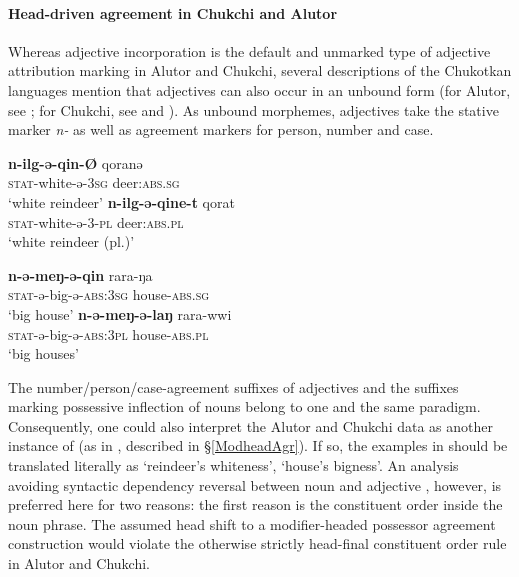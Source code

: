 \paragraph*{Head\hyp{}driven agreement in Chukchi and Alutor}
Whereas adjective incorporation is the default and unmarked type of adjective attribution marking in Alutor and Chukchi, several descriptions of the Chukotkan languages mention that adjectives can also occur in an unbound form (for Alutor, see \citealt{nagayama2003}; for Chukchi, see \citealt[103–104, 421–429]{skorik1960} and \citealt[251]{comrie1981}). As unbound morphemes, adjectives take the stative marker \textit{n-} as well as agreement markers for person, number and case.
\begin{exe}
\ex
\label{chukchi alutor free adj}
\begin{xlist}
\begin{xlist}
\ex
\gll	\textbf{n-ilg-ə-qin-Ø} qoranə\\
	\textsc{stat}-white-ə-\textsc{3sg} deer:\textsc{abs.sg}\\
\glt	‘white reindeer’
\ex
\gll	\textbf{n-ilg-ə-qine-t} qorat\\
	\textsc{stat}-white-ə-3-\textsc{pl} deer:\textsc{abs.pl}\\
\glt	‘white reindeer (pl.)’
\end{xlist}
\begin{xlist}
\ex
\gll	\textbf{n-ə-meŋ-ə-qin} rara-ŋa\\
	\textsc{stat}-ə-big-ə-\textsc{abs:3sg} house-\textsc{abs.sg}\\
\glt	‘big house’
\ex
\gll	\textbf{n-ə-meŋ-ə-laŋ} rara-wwi\\
	\textsc{stat}-ə-big-ə-\textsc{abs:3pl} house-\textsc{abs.pl}\\
\glt	‘big houses’
\end{xlist}
\end{xlist}
\end{exe}
The number/person/case-agreement suffixes of adjectives and the suffixes marking possessive inflection of nouns belong to one and the same paradigm. Consequently, one could also interpret the Alutor and Chukchi data as another instance of  (as in , described in \S\ref{ModheadAgr}). If so, the examples in  should be translated literally as ‘reindeer's whiteness’, ‘house's bigness’. An analysis avoiding syntactic dependency reversal between noun and adjective \citep[cf.][]{malchukov2000}, however, is preferred here for two reasons: the first reason is the constituent order inside the noun phrase. The assumed head shift to a modifier\hyp{}headed possessor agreement construction would violate the otherwise strictly head-final constituent order rule in Alutor and Chukchi. 

